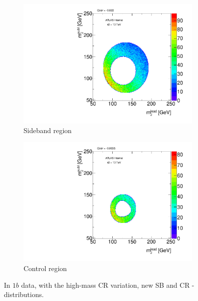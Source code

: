 \begin{figure}[htbp!]
\centering
\captionsetup{justification=centering}
    \begin{subfigure}[b]{0.39\textwidth}
        \includegraphics[width=\textwidth,angle=-90]{figures/boosted/Syst_CRSB/CR_High_Sideband_OneTag_mH0H1.pdf}
        \caption{Sideband region}
        \label{CRSB:CR_High_SB}
    \end{subfigure}
    \quad
    \begin{subfigure}[b]{0.39\textwidth}
        \includegraphics[width=\textwidth,angle=-90]{figures/boosted/Syst_CRSB/CR_High_Control_OneTag_mH0H1.pdf}
        \caption{Control region}
        \label{CRSB:CR_High_CR}
    \end{subfigure}
\caption{In $1b$ data, with the high-mass CR variation, new SB and CR \mleadJ-\msublJ~ distributions.}
\label{CRSB:CR_High}
\end{figure}

